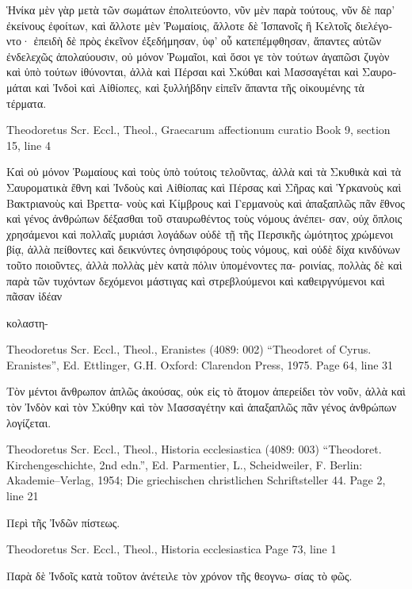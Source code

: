 \documentclass[12pt,letterpaper,twoside,final]{memoir}
\begin{document}
\begin{greek}
      Ἡνίκα μὲν γὰρ μετὰ τῶν σωμάτων ἐπολιτεύοντο, νῦν μὲν 
παρὰ τούτους, νῦν δὲ παρ' ἐκείνους ἐφοίτων, καὶ ἄλλοτε μὲν 
Ῥωμαίοις, ἄλλοτε δὲ Ἱσπανοῖς ἢ Κελτοῖς διελέγοντο· ἐπειδὴ 
δὲ πρὸς ἐκεῖνον ἐξεδήμησαν, ὑφ' οὗ κατεπέμφθησαν, ἅπαντες 
αὐτῶν ἐνδελεχῶς ἀπολαύουσιν, οὐ μόνον Ῥωμαῖοι, καὶ ὅσοι γε 
τὸν τούτων ἀγαπῶσι ζυγὸν καὶ ὑπὸ τούτων ἰθύνονται, ἀλλὰ καὶ 
Πέρσαι καὶ Σκύθαι καὶ Μασσαγέται καὶ Σαυρομάται καὶ Ἰνδοὶ 
καὶ Αἰθίοπες, καὶ ξυλλήβδην εἰπεῖν ἅπαντα τῆς οἰκουμένης τὰ 
τέρματα. 



Theodoretus Scr. Eccl., Theol., Graecarum affectionum curatio 
Book 9, section 15, line 4

                                                             Καὶ οὐ 
μόνον Ῥωμαίους καὶ τοὺς ὑπὸ τούτοις τελοῦντας, ἀλλὰ καὶ τὰ 
Σκυθικὰ καὶ τὰ Σαυροματικὰ ἔθνη καὶ Ἰνδοὺς καὶ Αἰθίοπας καὶ 
Πέρσας καὶ Σῆρας καὶ Ὑρκανοὺς καὶ Βακτριανοὺς καὶ Βρεττα-
νοὺς καὶ Κίμβρους καὶ Γερμανοὺς καὶ ἁπαξαπλῶς πᾶν ἔθνος καὶ 
γένος ἀνθρώπων δέξασθαι τοῦ σταυρωθέντος τοὺς νόμους ἀνέπει-
σαν, οὐχ ὅπλοις χρησάμενοι καὶ πολλαῖς μυριάσι λογάδων οὐδὲ 
τῇ τῆς Περσικῆς ὠμότητος χρώμενοι βίᾳ, ἀλλὰ πείθοντες καὶ 
δεικνύντες ὀνησιφόρους τοὺς νόμους, καὶ οὐδὲ δίχα κινδύνων 
τοῦτο ποιοῦντες, ἀλλὰ πολλὰς μὲν κατὰ πόλιν ὑπομένοντες πα-
ροινίας, πολλὰς δὲ καὶ παρὰ τῶν τυχόντων δεχόμενοι μάστιγας 
καὶ στρεβλούμενοι καὶ καθειργνύμενοι καὶ πᾶσαν ἰδέαν

κολαστη-



Theodoretus Scr. Eccl., Theol., Eranistes (4089: 002)
“Theodoret of Cyrus. Eranistes”, Ed. Ettlinger, G.H.
Oxford: Clarendon Press, 1975.
Page 64, line 31

                              Τὸν μέντοι ἄνθρωπον ἁπλῶς ἀκούσας, 
οὐκ εἰς τὸ ἄτομον ἀπερείδει τὸν νοῦν, ἀλλὰ καὶ τὸν Ἰνδὸν καὶ τὸν 
Σκύθην καὶ τὸν Μασσαγέτην καὶ ἁπαξαπλῶς πᾶν γένος ἀνθρώπων 
λογίζεται. 



Theodoretus Scr. Eccl., Theol., Historia ecclesiastica (4089: 003)
“Theodoret. Kirchengeschichte, 2nd edn.”, Ed. Parmentier, L., Scheidweiler, F.
Berlin: Akademie–Verlag, 1954; Die griechischen christlichen Schriftsteller 44.
Page 2, line 21

     Περὶ τῆς Ἰνδῶν πίστεως. 



Theodoretus Scr. Eccl., Theol., Historia ecclesiastica 
Page 73, line 1

Παρὰ δὲ Ἰνδοῖς κατὰ τοῦτον ἀνέτειλε τὸν χρόνον τῆς θεογνω-
σίας τὸ φῶς. 




\end{greek}
\end{document}
